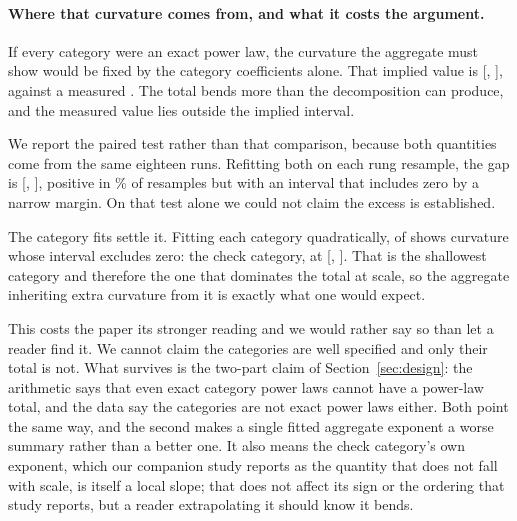 \documentclass[11pt]{article}
\begin{document}
\paragraph{Where that curvature comes from, and what it costs the argument.}
If every category were an exact power law, the curvature the aggregate must show
would be fixed by the category coefficients alone. That implied value is
 [, ], against a
measured . The total bends more than the decomposition can
produce, and the measured value lies outside the implied interval.

We report the paired test rather than that comparison, because both quantities come
from the same eighteen runs. Refitting both on each rung resample, the gap is
 [, ], positive in
\% of resamples but with an interval that includes zero by a
narrow margin. On that test alone we could not claim the excess is established.

The category fits settle it. Fitting each category quadratically,
 of  shows curvature whose interval
excludes zero: the check category, at 
[, ]. That is the shallowest category and
therefore the one that dominates the total at scale, so the aggregate inheriting
extra curvature from it is exactly what one would expect.

This costs the paper its stronger reading and we would rather say so than let a
reader find it. We cannot claim the categories are well specified and only their
total is not. What survives is the two-part claim of Section~\ref{sec:design}: the
arithmetic says that even exact category power laws cannot have a power-law total,
and the data say the categories are not exact power laws either. Both point the same
way, and the second makes a single fitted aggregate exponent a worse summary rather
than a better one. It also means the check category's own exponent, which our
companion study reports as the quantity that does not fall with scale, is itself a
local slope; that does not affect its sign or the ordering that study reports, but a
reader extrapolating it should know it bends.
\end{document}

